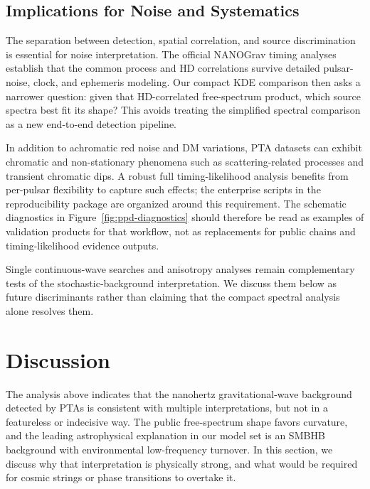 \documentclass[symmetry,article,submit,pdftex,moreauthors]{Definitions/mdpi}
\begin{document}
\subsection{Implications for Noise and Systematics}
The separation between detection, spatial correlation, and source discrimination is essential for noise interpretation. The official NANOGrav timing analyses establish that the common process and HD correlations survive detailed pulsar-noise, clock, and ephemeris modeling. Our compact KDE comparison then asks a narrower question: given that HD-correlated free-spectrum product, which source spectra best fit its shape? This avoids treating the simplified spectral comparison as a new end-to-end detection pipeline.

In addition to achromatic red noise and DM variations, PTA datasets can exhibit chromatic and non-stationary phenomena such as scattering-related processes and transient chromatic dips. A robust full timing-likelihood analysis benefits from per-pulsar flexibility to capture such effects; the enterprise scripts in the reproducibility package are organized around this requirement. The schematic diagnostics in Figure~\ref{fig:ppd-diagnostics} should therefore be read as examples of validation products for that workflow, not as replacements for public chains and timing-likelihood evidence outputs.

Single continuous-wave searches and anisotropy analyses remain complementary tests of the stochastic-background interpretation. We discuss them below as future discriminants rather than claiming that the compact spectral analysis alone resolves them.

\section{Discussion}\label{sec:discussion}
The analysis above indicates that the nanohertz gravitational-wave background detected by PTAs is consistent with multiple interpretations, but not in a featureless or indecisive way. The public free-spectrum shape favors curvature, and the leading astrophysical explanation in our model set is an SMBHB background with environmental low-frequency turnover. In this section, we discuss why that interpretation is physically strong, and what would be required for cosmic strings or phase transitions to overtake it.
\end{document}
